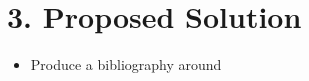\documentclass[11pt, a4paper, twoside, openright]{report}
\begin{document}
\section*{3. Proposed Solution}

%
%



\begin{itemize}
    \item Produce a bibliography around 

\end{itemize}

%
%
%
%
\end{document}
